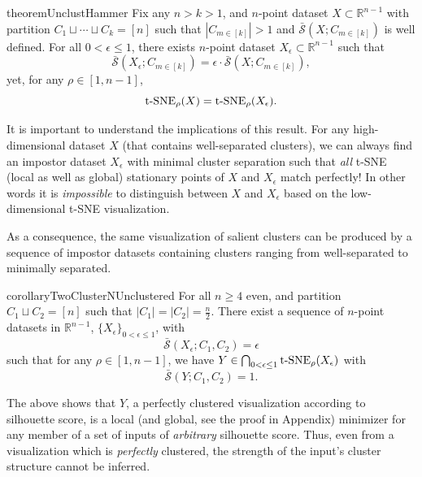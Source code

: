 \begin{restatable}{theorem}{UnclustHammer} 
\label{thm:unclustHammer}
    Fix any $n > k > 1$, and $n$-point dataset $X \subset \mathbb{R}^{n-1}$ with partition $C_1 \sqcup \cdots \sqcup C_k = [n]$ such that $|C_{m\in[k]}| > 1$ and $\bar{\mathcal{S}}(X; C_{m\in[k]})$ is well defined. For all $0 < \epsilon \leq 1$, there exists $n$-point dataset $X_\epsilon \subset \mathbb{R}^{n-1}$ such that 
    $$\bar{\mathcal{S}}(X_\epsilon; C_{m\in[k]}) = \epsilon \cdot \bar{\mathcal{S}}(X; C_{m\in[k]}), $$
    yet, for any $\rho \in [1, n-1]$,
    $${\operatorname*{t-SNE}}_\rho(X) = {\operatorname*{t-SNE}}_\rho(X_\epsilon).$$
\end{restatable}
It is important to understand the implications of this result. For any high-dimensional dataset $X$ (that contains well-separated clusters), we can always find an impostor dataset  $X_\epsilon$ with minimal cluster separation such that \emph{all} t-SNE (local as well as global) stationary points of $X$ and $X_\epsilon$ match perfectly! In other words it is \emph{impossible} to distinguish between $X$ and $X_\epsilon$ based on the low-dimensional t-SNE visualization.




As a consequence, the same visualization of salient clusters can be produced by a sequence of impostor datasets containing clusters ranging from well-separated to minimally separated.
\begin{restatable}{corollary}{TwoClusterNUnclustered} 
\label{cor:twoCluster_n_Unclustered}
    For all $n \geq 4$ even, and partition $C_1 \sqcup C_2 = [n]$ such that $|C_1|=|C_2|=\frac{n}{2}$.
    There exist a sequence of $n$-point datasets in $\mathbb{R}^{n-1}$, $\{ X_\epsilon\}_{0 < \epsilon \leq 1}$, with 
        $$\bar{\mathcal{S}}(X_\epsilon; C_1,C_2) = \epsilon$$
    such that for any $\rho \in [1, n-1]$, we have $Y\in \bigcap_{0<\epsilon \leq 1}{\operatorname*{t-SNE}}_\rho(X_\epsilon)$ with
    $$\bar{\mathcal{S}}(Y; C_1,C_2) = 1.$$ 
\end{restatable}
The above shows that $Y$, a perfectly clustered visualization according to silhouette score, is a local (and  global, see the proof in Appendix) %
minimizer for any member of a set of inputs of \textit{arbitrary} silhouette score. %
Thus, even from a visualization which is \textit{perfectly} clustered, the strength of the input's cluster structure cannot be inferred.  %



